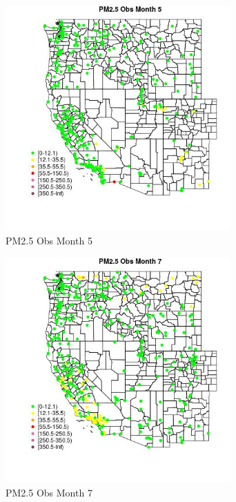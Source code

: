 \begin{figure} 
\centering  
\includegraphics[width=0.77\textwidth]{Code_Outputs/Report_ML_input_PM25_Step4_part_e_de_duplicated_aves_compiled_2019-05-18wNAs_MapObsMo5PM25_Obs.jpg} 
\caption{\label{fig:Report_ML_input_PM25_Step4_part_e_de_duplicated_aves_compiled_2019-05-18wNAsMapObsMo5PM25_Obs}PM2.5 Obs Month 5} 
\end{figure} 
 

\begin{figure} 
\centering  
\includegraphics[width=0.77\textwidth]{Code_Outputs/Report_ML_input_PM25_Step4_part_e_de_duplicated_aves_compiled_2019-05-18wNAs_MapObsMo7PM25_Obs.jpg} 
\caption{\label{fig:Report_ML_input_PM25_Step4_part_e_de_duplicated_aves_compiled_2019-05-18wNAsMapObsMo7PM25_Obs}PM2.5 Obs Month 7} 
\end{figure} 
 

